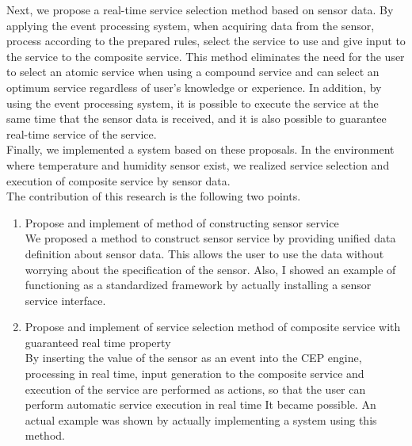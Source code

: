 \documentclass{kuisthesis}			%
\begin{document}
\begin{eabstract}
Next, we propose a real-time service selection method based on sensor data. By applying the event processing system, when acquiring data from the sensor, process according to the prepared rules, select the service to use and give input to the service to the composite service. This method eliminates the need for the user to select an atomic service when using a compound service and can select an optimum service regardless of user's knowledge or experience. In addition, by using the event processing system, it is possible to execute the service at the same time that the sensor data is received, and it is also possible to guarantee real-time service of the service.\\
Finally, we implemented a system based on these proposals. In the environment where temperature and humidity sensor exist, we realized service selection and execution of composite service by sensor data.\\
The contribution of this research is the following two points.
\begin{enumerate}
\item Propose and implement of method of constructing sensor service\\
We proposed a method to construct sensor service by providing unified data definition about sensor data. This allows the user to use the data without worrying about the specification of the sensor. Also, I showed an example of functioning as a standardized framework by actually installing a sensor service interface.
\item Propose and implement of service selection method of composite service with guaranteed real time property\\
By inserting the value of the sensor as an event into the CEP engine, processing in real time, input generation to the composite service and execution of the service are performed as actions, so that the user can perform automatic service execution in real time It became possible. An actual example was shown by actually implementing a system using this method.
\end{enumerate}
\end{eabstract}

\tableofcontents				%

\end{document}
